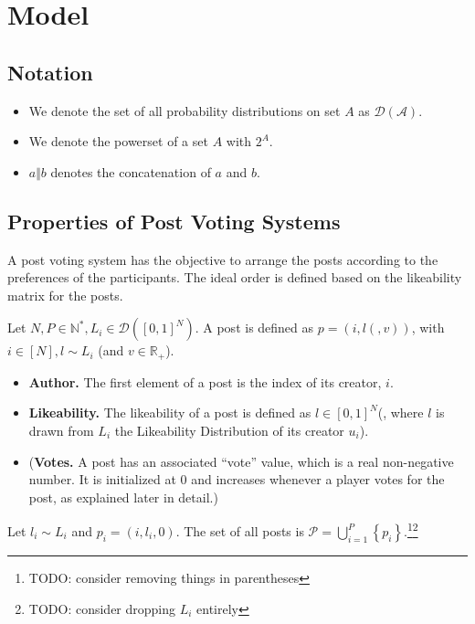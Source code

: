\section{Model}
  \subsection{Notation}
    \begin{itemize}
      \item We denote the set of all probability distributions on set $A$ as
      $\mathcal{D\left(A\right)}$.
      \item We denote the powerset of a set $A$ with $2^A$.
      \item $a \Vert b$ denotes the concatenation of $a$ and $b$.
    \end{itemize}

  \subsection{Properties of Post Voting Systems}
    A post voting system has the objective to arrange the posts according to the
    preferences of the participants. The ideal order is defined based on the
    likeability matrix for the posts.

    \begin{definition}[Post]
      Let $N, P \in \mathbb{N}^*, L_i \in \mathcal{D}\left(\left[0,
      1\right]^N\right)$. A post is defined as $p = \left(i, l(, v)\right)$,
      with $i \in \left[N\right], l \sim L_i$ (and $v \in \mathbb{R}_{+}$).
      \begin{itemize}
        \item \textbf{Author.} The first element of a post is the index of its
        creator, $i$.

        \item \textbf{Likeability.} The likeability of a post is defined as $l
        \in \left[0, 1\right]^N$(, where $l$ is drawn from $L_i$ the Likeability
        Distribution of its creator $u_i$).

        \item (\textbf{Votes.} A post has an associated ``vote'' value, which is a
        real non-negative number. It is initialized at 0 and increases whenever a
        player votes for the post, as explained later in detail.)
      \end{itemize}
      Let $l_i \sim L_i$ and $p_i = \left(i, l_i, 0\right)$. The set of all
      posts is $\mathcal{P} = \bigcup\limits_{i=1}^P
      \left\{p_i\right\}$.\footnote{TODO: consider removing things in
      parentheses}\fnmsep\footnote{TODO: consider dropping $L_i$ entirely}
    \end{definition}


